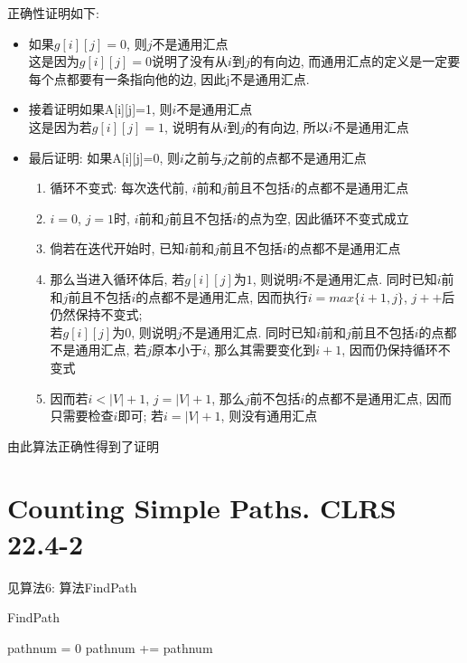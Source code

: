 \documentclass{article}
\begin{document}
正确性证明如下: \\
\begin{itemize}
\item 如果$g[i][j]=0$, 则$j$不是通用汇点 \\
这是因为$g[i][j]=0$说明了没有从$i$到$j$的有向边, 而通用汇点的定义是一定要每个点都要有一条指向他的边, 因此j不是通用汇点.
\item 接着证明如果A[i][j]=1, 则$i$不是通用汇点 \\
这是因为若$g[i][j]=1$, 说明有从$i$到$j$的有向边, 所以$i$不是通用汇点
\item 最后证明: 如果A[i][j]=0, 则$i$之前与$j$之前的点都不是通用汇点
\begin{enumerate}[1)]
\item 循环不变式: 每次迭代前, $i$前和$j$前且不包括$i$的点都不是通用汇点
\item $i=0$, $j=1$时, $i$前和$j$前且不包括$i$的点为空, 因此循环不变式成立
\item 倘若在迭代开始时, 已知$i$前和$j$前且不包括$i$的点都不是通用汇点
\item 那么当进入循环体后, 若$g[i][j]$为$1$, 则说明$i$不是通用汇点. 同时已知$i$前和$j$前且不包括$i$的点都不是通用汇点, 因而执行$i=max\{i+1,j\}$, $j++$后仍然保持不变式;  \\
若$g[i][j]$为$0$, 则说明$j$不是通用汇点. 同时已知$i$前和$j$前且不包括$i$的点都不是通用汇点, 若$j$原本小于$i$, 那么其需要变化到$i+1$, 因而仍保持循环不变式
\item 因而若$i < |V|+1$, $j=|V|+1$, 那么$j$前不包括$i$的点都不是通用汇点, 因而只需要检查$i$即可; 若$i=|V|+1$, 则没有通用汇点
\end{enumerate}
\end{itemize}
由此算法正确性得到了证明

\section{Counting Simple Paths. CLRS 22.4-2}
见算法6: 算法FindPath

\begin{algorithm}
\caption{FindPath}
\begin{algorithmic}[1]
\State {}
\Else
\State pathnum = 0
\State pathnum += 
\EndFor
\State \Return pathnum
\EndIf
\EndProcedure
\end{algorithmic}
\end{algorithm}
\end{document}
